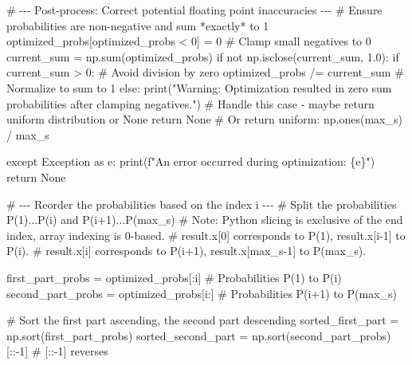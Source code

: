 \documentclass[
  letterpaper,
  DIV=11,
  numbers=noendperiod]{scrartcl}
\newenvironment{Shaded}{\begin{snugshade}}{\end{snugshade}}
\newcommand{\BuiltInTok}[1]{\textcolor[rgb]{0.00,0.23,0.31}{#1}}
\newcommand{\CommentTok}[1]{\textcolor[rgb]{0.37,0.37,0.37}{#1}}
\newcommand{\ControlFlowTok}[1]{\textcolor[rgb]{0.00,0.23,0.31}{#1}}
\newcommand{\DecValTok}[1]{\textcolor[rgb]{0.68,0.00,0.00}{#1}}
\newcommand{\FloatTok}[1]{\textcolor[rgb]{0.68,0.00,0.00}{#1}}
\newcommand{\ImportTok}[1]{\textcolor[rgb]{0.00,0.46,0.62}{#1}}
\newcommand{\KeywordTok}[1]{\textcolor[rgb]{0.00,0.23,0.31}{#1}}
\newcommand{\NormalTok}[1]{\textcolor[rgb]{0.00,0.23,0.31}{#1}}
\newcommand{\OperatorTok}[1]{\textcolor[rgb]{0.37,0.37,0.37}{#1}}
\newcommand{\PreprocessorTok}[1]{\textcolor[rgb]{0.68,0.00,0.00}{#1}}
\newcommand{\SpecialCharTok}[1]{\textcolor[rgb]{0.37,0.37,0.37}{#1}}
\newcommand{\SpecialStringTok}[1]{\textcolor[rgb]{0.13,0.47,0.30}{#1}}
\newcommand{\StringTok}[1]{\textcolor[rgb]{0.13,0.47,0.30}{#1}}
\newcommand{\VariableTok}[1]{\textcolor[rgb]{0.07,0.07,0.07}{#1}}
\begin{document}
\begin{Shaded}
\begin{Highlighting}[]
        \CommentTok{\# {-}{-}{-} Post{-}process: Correct potential floating point inaccuracies {-}{-}{-}}
        \CommentTok{\# Ensure probabilities are non{-}negative and sum *exactly* to 1}
\NormalTok{        optimized\_probs[optimized\_probs }\OperatorTok{\textless{}} \DecValTok{0}\NormalTok{] }\OperatorTok{=} \DecValTok{0} \CommentTok{\# Clamp small negatives to 0}
\NormalTok{        current\_sum }\OperatorTok{=}\NormalTok{ np.}\BuiltInTok{sum}\NormalTok{(optimized\_probs)}
        \ControlFlowTok{if} \KeywordTok{not}\NormalTok{ np.isclose(current\_sum, }\FloatTok{1.0}\NormalTok{):}
            \ControlFlowTok{if}\NormalTok{ current\_sum }\OperatorTok{\textgreater{}} \DecValTok{0}\NormalTok{: }\CommentTok{\# Avoid division by zero}
\NormalTok{                 optimized\_probs }\OperatorTok{/=}\NormalTok{ current\_sum }\CommentTok{\# Normalize to sum to 1}
            \ControlFlowTok{else}\NormalTok{:}
                 \BuiltInTok{print}\NormalTok{(}\StringTok{"Warning: Optimization resulted in zero sum probabilities after clamping negatives."}\NormalTok{)}
                 \CommentTok{\# Handle this case {-} maybe return uniform distribution or None}
                 \ControlFlowTok{return} \VariableTok{None} \CommentTok{\# Or return uniform: np.ones(max\_s) / max\_s}

    \ControlFlowTok{except} \PreprocessorTok{Exception} \ImportTok{as}\NormalTok{ e:}
        \BuiltInTok{print}\NormalTok{(}\SpecialStringTok{f"An error occurred during optimization: }\SpecialCharTok{\{}\NormalTok{e}\SpecialCharTok{\}}\SpecialStringTok{"}\NormalTok{)}
        \ControlFlowTok{return} \VariableTok{None}

    \CommentTok{\# {-}{-}{-} Reorder the probabilities based on the index \textquotesingle{}i\textquotesingle{} {-}{-}{-}}
    \CommentTok{\# Split the probabilities P(1)...P(i) and P(i+1)...P(max\_s)}
    \CommentTok{\# Note: Python slicing is exclusive of the end index, array indexing is 0{-}based.}
    \CommentTok{\# result.x[0] corresponds to P(1), result.x[i{-}1] to P(i).}
    \CommentTok{\# result.x[i] corresponds to P(i+1), result.x[max\_s{-}1] to P(max\_s).}

\NormalTok{    first\_part\_probs }\OperatorTok{=}\NormalTok{ optimized\_probs[:i]   }\CommentTok{\# Probabilities P(1) to P(i)}
\NormalTok{    second\_part\_probs }\OperatorTok{=}\NormalTok{ optimized\_probs[i:]  }\CommentTok{\# Probabilities P(i+1) to P(max\_s)}

    \CommentTok{\# Sort the first part ascending, the second part descending}
\NormalTok{    sorted\_first\_part }\OperatorTok{=}\NormalTok{ np.sort(first\_part\_probs)}
\NormalTok{    sorted\_second\_part }\OperatorTok{=}\NormalTok{ np.sort(second\_part\_probs)[::}\OperatorTok{{-}}\DecValTok{1}\NormalTok{] }\CommentTok{\# [::{-}1] reverses}


\end{Highlighting}
\end{Shaded}
\end{document}
